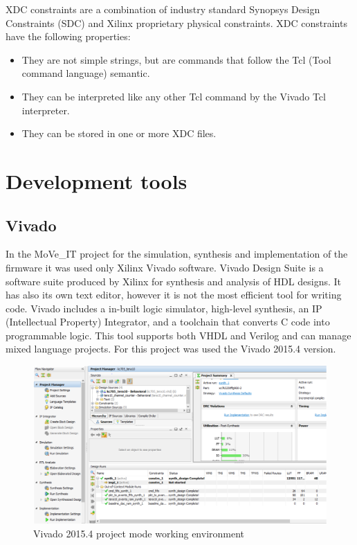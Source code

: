 \noindent XDC constraints are a combination of industry standard Synopsys Design Constraints (SDC) and Xilinx proprietary physical constraints. XDC constraints have the following properties:
\begin{itemize}
	\item They are not simple strings, but are commands that follow the Tcl (Tool command language) semantic.
	\item They can be interpreted like any other Tcl command by the Vivado Tcl interpreter.
	\item They can be stored in one or more XDC files.
\end{itemize}

\section{Development tools}

\subsection{Vivado}
\noindent In the MoVe\_IT project for the simulation, synthesis and implementation of the firmware it was used only Xilinx Vivado software.
\newline
Vivado Design Suite is a software suite produced by Xilinx for synthesis and analysis of HDL designs. It has also its own text editor, however it is not the most efficient tool for writing code.
Vivado includes a in-built logic simulator, high-level synthesis, an IP (Intellectual Property) Integrator, and a toolchain that converts C code into programmable logic\cite{vivado}.
This tool supports both VHDL and Verilog and can manage mixed language projects.
For this project was used the Vivado 2015.4 version. 
\begin{figure}[H]
	\centering
	\includegraphics[width=0.9\linewidth]{IMG/ch3/VIVADO}
	\caption{Vivado 2015.4 project mode working environment}
	\label{fig:vivado}
\end{figure}

